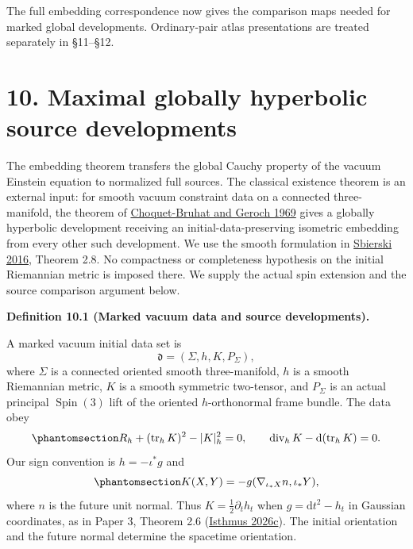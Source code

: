 \documentclass[
  english,
  11pt,
  reqno]{amsart}
\makeatletter
\newcommand{\pandocstatementheading}[1]{%
  \par\addpenalty{\@beginparpenalty}%
  \addvspace{.5\baselineskip plus .2\baselineskip minus .2\baselineskip}%
  {\normalfont\bfseries #1\par}%
  \nobreak\@afterindenttrue\@afterheading
}
\makeatother
\begin{document}
The full embedding correspondence now gives the comparison maps needed
for marked global developments. Ordinary-pair atlas presentations are
treated separately in §11--§12.

\protect{}\label{sec:global-maximal-source-development}

\section{10. Maximal globally hyperbolic source
developments}\label{maximal-globally-hyperbolic-source-developments}

The embedding theorem transfers the global Cauchy property of the vacuum
Einstein equation to normalized full sources. The classical existence
theorem is an external input: for smooth vacuum constraint data on a
connected three-manifold, the theorem of
\hyperref[ref-ChoquetBruhatGeroch1969]{Choquet-Bruhat and Geroch 1969}
gives a globally hyperbolic development receiving an
initial-data-preserving isometric embedding from every other such
development. We use the smooth formulation in
\hyperref[ref-Sbierski2016]{Sbierski 2016}, Theorem 2.8. No compactness
or completeness hypothesis on the initial Riemannian metric is imposed
there. We supply the actual spin extension and the source comparison
argument below.

\pandocstatementheading{\protect{}\label{def:global-marked-vacuum-data}Definition 10.1 (Marked vacuum data and source developments).}

A marked vacuum initial data set is \[
\mathfrak d=(\Sigma,h,K,P_\Sigma),
\] where \(\Sigma\) is a connected oriented smooth three-manifold, \(h\)
is a smooth Riemannian metric, \(K\) is a smooth symmetric two-tensor,
and \(P_\Sigma\) is an actual principal \(\operatorname{Spin}(3)\) lift
of the oriented \(h\)-orthonormal frame bundle. The data obey
\begin{equation}\protect\phantomsection\label{eq:global-marked-vacuum-constraints}{
R_h+(\operatorname{tr}_hK)^2-|K|_h^2=0,
\qquad
\operatorname{div}_hK-\mathrm d(\operatorname{tr}_hK)=0.
}\end{equation} Our sign convention is \(h=-\iota^*g\) and
\begin{equation}\protect\phantomsection\label{eq:global-initial-second-form-sign}{
K(X,Y)=-g(\nabla_{\iota_*X}n,\iota_*Y),
}\end{equation} where \(n\) is the future unit normal. Thus
\(K=\tfrac12\partial_t h_t\) when \(g=\mathrm dt^2-h_t\) in Gaussian
coordinates, as in Paper 3, Theorem 2.6
(\hyperref[ref-IsthmusSmooth2026]{Isthmus 2026c}). The initial
orientation and the future normal determine the spacetime orientation.
\end{document}
